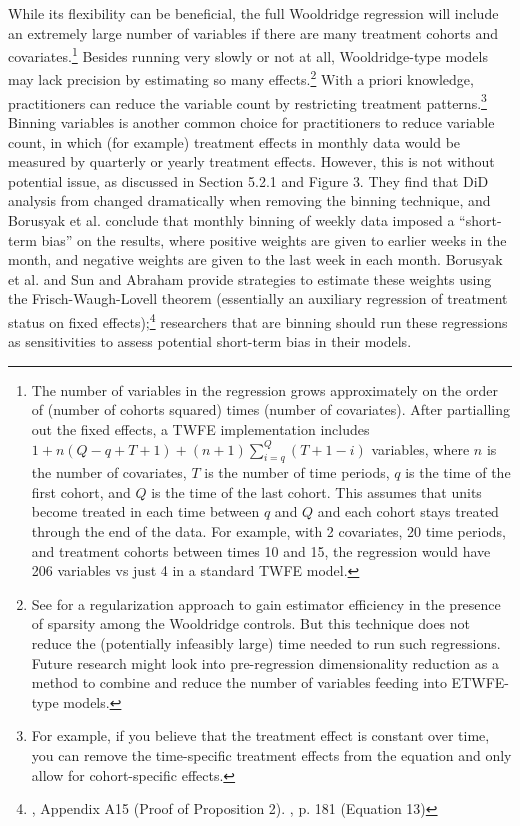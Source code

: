 \documentclass[12pt]{article}
\begin{document}
While its flexibility can be beneficial, the full Wooldridge regression will include an extremely large number of variables if there are many treatment cohorts and covariates.\footnote{The number of variables in the regression grows approximately on the order of (number of cohorts squared) times (number of covariates). After partialling out the fixed effects, a TWFE implementation includes $1 + n(Q-q+T+1) + (n+1) \sum_{i=q}^Q(T+1-i)$ variables, where $n$ is the number of covariates, $T$ is the number of time periods, $q$ is the time of the first cohort, and $Q$ is the time of the last cohort. This assumes that units become treated in each time between $q$ and $Q$ and each cohort stays treated through the end of the data. For example, with 2 covariates, 20 time periods, and treatment cohorts between times 10 and 15, the regression would have 206 variables vs just 4 in a standard TWFE model.}  Besides running very slowly or not at all, Wooldridge-type models may lack precision by estimating so many effects.\footnote{See \citet{faletto2023a} for a regularization approach to gain estimator efficiency in the presence of sparsity among the Wooldridge controls. But this technique does not reduce the (potentially infeasibly large) time needed to run such regressions. Future research might look into pre-regression dimensionality reduction as a method to combine and reduce the number of variables feeding into ETWFE-type models.}  With a priori knowledge, practitioners can reduce the variable count by restricting treatment patterns.\footnote{For example, if you believe that the treatment effect is constant over time, you can remove the time-specific treatment effects from the equation and only allow for cohort-specific effects.}  Binning variables is another common choice for practitioners to reduce variable count, in which (for example) treatment effects in monthly data would be measured by quarterly or yearly treatment effects. However, this is not without potential issue, as discussed in \citet{borusyak2024revisiting} Section 5.2.1 and Figure 3. They find that DiD analysis from \citet{broda2014} changed dramatically when removing the binning technique, and Borusyak et al. conclude that monthly binning of weekly data imposed a “short-term bias” on the results, where positive weights are given to earlier weeks in the month, and negative weights are given to the last week in each month. Borusyak et al. and Sun and Abraham provide strategies to estimate these weights using the Frisch-Waugh-Lovell theorem (essentially an auxiliary regression of treatment status on fixed effects);\footnote{\citet{borusyak2024revisiting}, Appendix A15 (Proof of Proposition 2). \citet{sunabr2021a}, p. 181 (Equation 13)}  researchers that are binning should run these regressions as sensitivities to assess potential short-term bias in their models.
\end{document}
